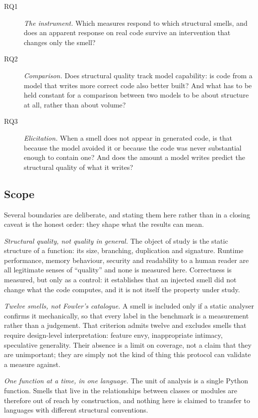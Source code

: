 \documentclass[10pt,a4paper,twocolumn]{article}
\begin{document}
\begin{description}
  \item[RQ1] \emph{The instrument.} Which measures respond to which structural
             smells, and does an apparent response on real code survive an
             intervention that changes only the smell?
  \item[RQ2] \emph{Comparison.} Does structural quality track model capability: is code from a model that writes more correct code also better built?
             And what has to be held constant for a comparison between two models
             to be about structure at all, rather than about volume?
  \item[RQ3] \emph{Elicitation.} When a smell does not appear in generated code,
             is that because the model avoided it or because the code was never substantial enough to contain one? And does the amount a model writes predict the structural quality of what it writes?
\end{description}

\subsection{Scope}
\label{sec:scope}

Several boundaries are deliberate, and stating them here rather than in a closing
caveat is the honest order: they shape what the results can mean.

\emph{Structural quality, not quality in general.} The object of study is the
static structure of a function: its size, branching, duplication and signature.
Runtime performance, memory behaviour, security and readability to a human
reader are all legitimate senses of ``quality'' and none is measured here.
Correctness is measured, but only as a control: it establishes that an injected
smell did not change what the code computes, and it is not itself the property
under study.

\emph{Twelve smells, not Fowler's catalogue.} A smell is included only if a
static analyser confirms it mechanically, so that every label in the benchmark
is a measurement rather than a judgement. That criterion admits twelve and
excludes smells that require design-level interpretation: feature envy,
inappropriate intimacy, speculative generality. Their absence is a limit on
coverage, not a claim that they are unimportant; they are simply not the kind of
thing this protocol can validate a measure against.

\emph{One function at a time, in one language.} The unit of analysis is a single
Python function. Smells that live in the relationships between classes or modules are therefore out of reach by construction, and nothing here is claimed
to transfer to languages with different structural conventions.
\end{document}
